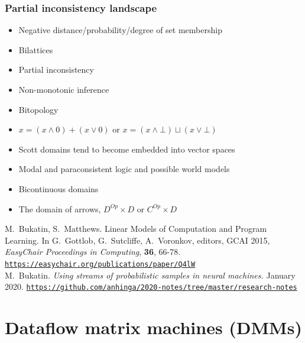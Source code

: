\documentclass{beamer}
\newcommand{\msblue}[1]{{\color{myblue} #1}}
\begin{document}
\begin{frame}

  \frametitle{Partial inconsistency landscape}


\begin{itemize}

\item{Negative distance/probability/degree of set membership}

\item{Bilattices}

\item{Partial inconsistency}

\item{Non-monotonic inference}

\item{Bitopology}

\item{$x = (x \wedge 0) + (x \vee 0)$ or $x = (x \wedge \bot) \sqcup (x \vee \bot)$ }

\item{\msblue{Scott domains tend to become embedded into vector spaces}}

\item{Modal and paraconsistent logic and possible world models}

\item{Bicontinuous domains}

\item{The domain of arrows, $D^{Op}\times D$ or $C^{Op}\times D$}

\end{itemize}

\end{frame}

\begin{frame}
  M.~Bukatin, S.~Matthews.
Linear Models of Computation and Program Learning. In G.~Gottlob, G.~Sutcliffe, A.~Voronkov, editors,
GCAI 2015, {\em EasyChair Proceedings in Computing}, {\bf 36}, 66-78.
\href{https://easychair.org/publications/paper/Q4lW}{\tt\footnotesize https://easychair.org/publications/paper/Q4lW}\\[6ex]

M.~Bukatin.
{\em Using streams of probabilistic samples in neural machines.} January 2020.
\href{https://github.com/anhinga/2020-notes/tree/master/research-notes}{\tt\footnotesize https://github.com/anhinga/2020-notes/tree/master/research-notes}


\end{frame}


\section{Dataflow matrix machines (DMMs)}
\end{document}
